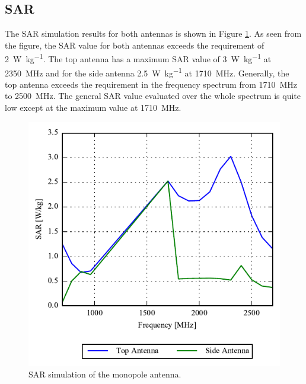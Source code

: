 \FloatBarrier
\subsection{SAR}
The SAR simulation results for both antennas is shown in Figure \ref{fig:sol1_sar}. As seen from the figure, the SAR value for both antennas exceeds the requirement of \SI{2}{W\per kg}. The top antenna has a maximum SAR value of \SI{3}{W\per kg} at \SI{2350}{MHz} and for the side antenna \SI{2.5}{W\per kg} at \SI{1710}{MHz}. Generally, the top antenna exceeds the requirement in the frequency spectrum from \SI{1710}{MHz} to \SI{2500}{MHz}. The general SAR value evaluated over the whole spectrum is quite low except at the maximum value at \SI{1710}{MHz}. 

\begin{figure}[htbp]
    \centering
    \includegraphics{img/tech_sol/monopole/sar/sol1_sar.pdf}
    \caption{SAR simulation of the monopole antenna.}
    \label{fig:sol1_sar}
\end{figure}


